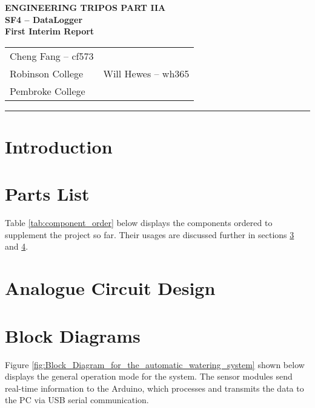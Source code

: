 \documentclass[a4paper,11pt]{article}
\renewcommand{\arraystretch}{1.2}
\renewcommand{\maketitle}{
    \begin{center}
        \LARGE \textbf{ENGINEERING TRIPOS PART IIA} \\[0.5em]
        \Large \textbf{SF4 – DataLogger} \\[0.5em]
        \textbf{First Interim Report} \\[1.5em]
        \begin{tabularx}{0.7\textwidth}{X X}
            \centering \large Cheng Fang -- cf573 \\ \large Robinson College &
            \centering \large Will Hewes -- wh365 \\ \large Pembroke College
        \end{tabularx}
        \vspace{1em}
    \end{center}
}
\begin{document}
\maketitle
\hrule
\tableofcontents
\newpage

\section{Introduction}
\label{sec:Introduction}

\section{Parts List}
\label{sec:Parts_List}

Table \ref{tab:component_order} below displays the components 
ordered to supplement the project so far.
Their usages are discussed further in sections 
\ref{sec:Analogue_Circuit_Design} and \ref{sec:Block_Diagrams}.

\begin{table}[H]
    \centering
    \renewcommand{\arraystretch}{1.5}
    \caption{Component Order Summary}
    \label{tab:component_order}
\end{table}

\section{Analogue Circuit Design}
\label{sec:Analogue_Circuit_Design}

\section{Block Diagrams}
\label{sec:Block_Diagrams}

Figure \ref{fig:Block_Diagram_for_the_automatic_watering_system}
shown below displays the general operation mode for the system.
The sensor modules send real-time information to the Arduino,
which processes and transmits the data to the PC via USB serial communication.
\end{document}
